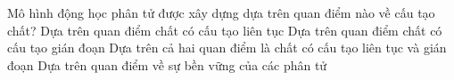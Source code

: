 \begin{ex} 
	Mô hình động học phân tử được xây dựng dựa trên quan điểm nào về cấu tạo chất?
	\choice
	{Dựa trên quan điểm chất có cấu tạo liên tục}
	{\True Dựa trên quan điểm chất có cấu tạo gián đoạn}
	{Dựa trên cả hai quan điểm là chất có cấu tạo liên tục và gián đoạn}
	{Dựa trên quan điểm về sự bền vững của các phân tử}
\end{ex}


